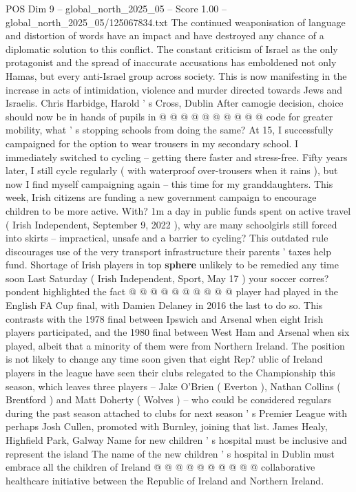 \begin{textsample}{POS Dim 9 – global\_north\_2025\_05 – Score 1.00 – global\_north\_2025\_05/125067834.txt}
The continued weaponisation of language and distortion of words have an impact and have destroyed any chance of a diplomatic solution to this conflict.
The constant criticism of Israel as the only protagonist and the spread of inaccurate accusations has emboldened not only Hamas, but every anti-Israel group across society.
This is now manifesting in the increase in acts of intimidation, violence and murder directed towards Jews and Israelis.
Chris Harbidge, Harold ' s Cross, Dublin After camogie decision, choice should now be in hands of pupils in @ @ @ @ @ @ @ @ @ @ code for greater mobility, what ' s stopping schools from doing the same?
At 15, I successfully campaigned for the option to wear trousers in my secondary school.
I immediately switched to cycling -- getting there faster and stress-free.
Fifty years later, I still cycle regularly ( with waterproof over-trousers when it rains ), but now I find myself campaigning again -- this time for my granddaughters.
This week, Irish citizens are funding a new government campaign to encourage children to be more active.
With? 1m a day in public funds spent on active travel ( Irish Independent, September 9, 2022 ), why are many schoolgirls still forced into skirts -- impractical, unsafe and a barrier to cycling?
This outdated rule discourages use of the very transport infrastructure their parents ' taxes help fund.
Shortage of Irish players in top \textbf{sphere} unlikely to be remedied any time soon Last Saturday ( Irish Independent, Sport, May 17 ) your soccer corres? pondent highlighted the fact @ @ @ @ @ @ @ @ @ @ player had played in the English FA Cup final, with Damien Delaney in 2016 the last to do so.
This contrasts with the 1978 final between Ipswich and Arsenal when eight Irish players participated, and the 1980 final between West Ham and Arsenal when six played, albeit that a minority of them were from Northern Ireland.
The position is not likely to change any time soon given that eight Rep? ublic of Ireland players in the league have seen their clubs relegated to the Championship this season, which leaves three players -- Jake O'Brien ( Everton ), Nathan Collins ( Brentford ) and Matt Doherty ( Wolves ) -- who could be considered regulars during the past season attached to clubs for next season ' s Premier League with perhaps Josh Cullen, promoted with Burnley, joining that list.
James Healy, Highfield Park, Galway Name for new children ' s hospital must be inclusive and represent the island The name of the new children ' s hospital in Dublin must embrace all the children of Ireland @ @ @ @ @ @ @ @ @ @ collaborative healthcare initiative between the Republic of Ireland and Northern Ireland.

\end{textsample}
